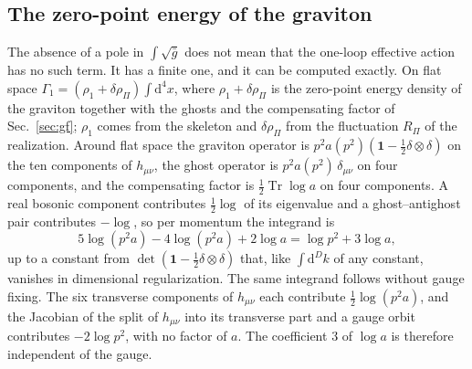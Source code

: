 \documentclass[a4paper,11pt]{article}
\newcommand{\dd}{\mathrm{d}}
\newcommand{\Tr}{\operatorname{Tr}}
\begin{document}
\subsection{The zero-point energy of the graviton}
\label{sec:vacuum}

The absence of a pole in $\int\sqrt{\bar g}$ does not mean that the one-loop effective action has no such term. It has a finite one, and it can be computed exactly. On flat space $\Gamma_1=(\rho_1+\delta\rho_\Pi)\int\dd^4x$, where $\rho_1+\delta\rho_\Pi$ is the zero-point energy density of the graviton together with the ghosts and the compensating factor of Sec.~\ref{sec:gf}; $\rho_1$ comes from the skeleton and $\delta\rho_\Pi$ from the fluctuation $R_\Pi$ of the realization. Around flat space the graviton operator is $p^2a(p^2)(\mathbf 1-\frac12\delta\otimes\delta)$ on the ten components of $h_{\mu\nu}$, the ghost operator is $p^2a(p^2)\,\delta_{\mu\nu}$ on four components, and the compensating factor is $\frac12\Tr\log a$ on four components. A real bosonic component contributes $\frac12\log$ of its eigenvalue and a ghost--antighost pair contributes $-\log$, so per momentum the integrand is
\begin{equation}
\label{eq:count}
5\log(p^2a)-4\log(p^2a)+2\log a=\log p^2+3\log a,
\end{equation}
up to a constant from $\det(\mathbf 1-\frac12\delta\otimes\delta)$ that, like $\int\dd^Dk$ of any constant, vanishes in dimensional regularization. The same integrand follows without gauge fixing. The six transverse components of $h_{\mu\nu}$ each contribute $\frac12\log(p^2a)$, and the Jacobian of the split of $h_{\mu\nu}$ into its transverse part and a gauge orbit contributes $-2\log p^2$, with no factor of $a$. The coefficient $3$ of $\log a$ is therefore independent of the gauge.
\end{document}
